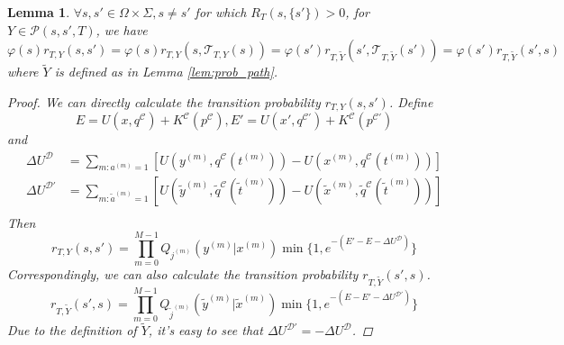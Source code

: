 \documentclass{article}
\newcommand{\cald}{\mathcal{D}}
\newcommand{\calc}{\mathcal{C}}
\newtheorem{lemma}{Lemma}
\begin{document}
\begin{lemma}\label{lem:detailed_balance_singleton}
	$\forall s, s'\in \Omega\times\Sigma, s\neq s'$ for which $R_T(s, \{ s' \}) > 0$, for $Y\in\mathcal{P}(s, s', T)$, we have
\begin{equation*}
	\varphi (s) r_{T, Y} (s, s') = \varphi(s)r_{T, Y}(s, \mathcal{T}_{T, Y}(s)) = \varphi (s') r_{T, \tilde{Y}} (s', \mathcal{T}_{T, \tilde{Y}}(s')) = \varphi (s') r_{T, \tilde{Y}} (s', s)
\end{equation*}
where $\tilde{Y}$ is defined as in Lemma \ref{lem:prob_path}.
\begin{proof}
    We can directly calculate the transition probability $r_{T, Y} (s, s')$. Define $$E = U(x, q^\calc) + K^\calc(p^\calc), E' = U(x', q^{\calc\prime}) + K^\calc(p^{\calc\prime})$$
and
\begin{align*}
	\Delta U^\cald &= \sum_{m:a^{(m)}=1} [U(y^{(m)}, q^\calc(t^{(m)})) - U(x^{(m)}, q^\calc(t^{(m)}))]\\
	\Delta U^{\cald\prime} &= \sum_{m:\tilde{a}^{(m)}=1} [U(\tilde{y}^{(m)}, \tilde{q}^\calc(\tilde{t}^{(m)})) - U(\tilde{x}^{(m)}, \tilde{q}^\calc(\tilde{t}^{(m)}))]\\
\end{align*}
Then
\[ r_{T, Y} (s, s') = \prod_{m = 0}^{M - 1} Q_{j^{(m)}} (y^{(m)} |x^{(m)}) \min\{1, e^{-(E' - E - \Delta U^\cald)}\}\]
Correspondingly, we can also calculate the transition probability $r_{T, \tilde{Y}} (s', s)$. 
\[ r_{T, \tilde{Y}} (s', s) = \prod_{m = 0}^{M - 1} Q_{\tilde{j}^{(m)}} (\tilde{y}^{(m)} | \tilde{x}^{(m)})\min\{1, e^{-(E - E' - \Delta U^{\cald\prime})}\} \]
Due to the definition of $\tilde{Y}$, it's easy to see that $\Delta U^{\cald\prime} = -\Delta U^\cald$.


\end{proof}
\end{lemma}
\end{document}
